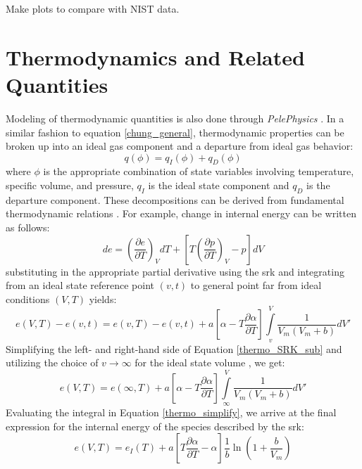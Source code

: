 Make plots to compare with NIST data.

\section{Thermodynamics and Related Quantities}
Modeling of thermodynamic quantities is also done through \textit{PelePhysics} \cite{}. In a similar fashion to equation \ref{chung_general}, thermodynamic properties can be broken up into an ideal gas component and a departure from ideal gas behavior:
\begin{equation} \label{thermo_general}
q(\phi) = q_{I}(\phi) + q_{D}(\phi)
\end{equation}
where $\phi$ is the appropriate combination of state variables involving temperature, specific volume, and pressure, $q_{I}$ is the ideal state component and $q_{D}$ is the departure component. These decompositions can be derived from fundamental thermodynamic relations \cite{}. For example, change in internal energy can be written as follows:
\begin{equation} \label{thermo_example}
de = \left( \dfrac{\partial e}{\partial T} \right)_{V} dT + \left[ T \left( \dfrac{\partial p}{\partial T} \right)_{V} - p  \right] dV
\end{equation}
substituting in the appropriate partial derivative using the \gls{srk} and integrating from an ideal state reference point $(v,t)$ to general point far from ideal conditions $(V,T)$ yields:
\begin{equation}  \label{thermo_SRK_sub}
e(V,T) - e(v,t) =  e(v,T) - e(v,t) + a \left[ \alpha - T \dfrac{\partial \alpha}{\partial T} \right] \int\limits_{v}^{V} \dfrac{1}{V_m(V_m + b)}dV'
\end{equation}
Simplifying the left- and right-hand side of Equation \ref{thermo_SRK_sub} and utilizing the choice of $v \to \infty$ for the ideal state volume \cite{}, we get:
\begin{equation} \label{thermo_simplify}
e(V,T) =  e(\infty,T) + a \left[ \alpha - T \dfrac{\partial \alpha}{\partial T} \right] \int\limits_{\infty}^{V} \dfrac{1}{V_m(V_m + b)}dV'
\end{equation}
Evaluating the integral in Equation \ref{thermo_simplify}, we arrive at the final expression for the internal energy of the species described by the \gls{srk}: 
\begin{equation} \label{thermo_final}
e(V,T) =  e_I(T) + a \left[ T \dfrac{\partial \alpha}{\partial T} - \alpha \right] \dfrac{1}{b}\ln\left( 1 + \dfrac{b}{V_m} \right)
\end{equation}
